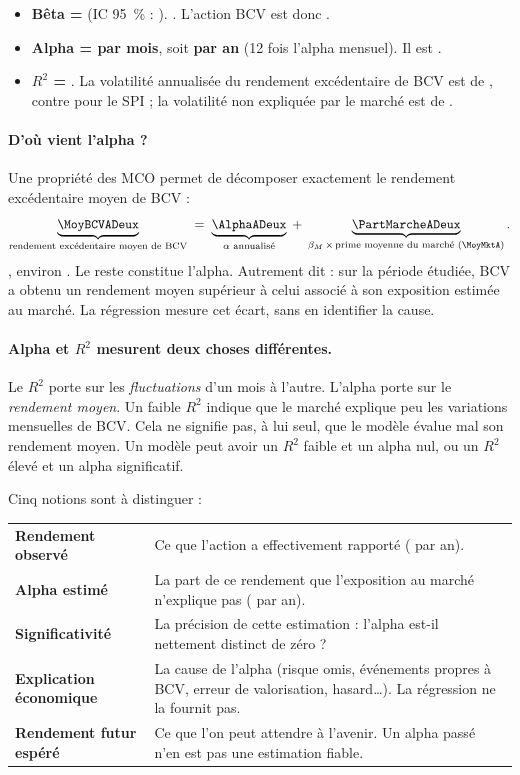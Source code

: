 \documentclass[11pt,a4paper]{article}
\begin{document}
\begin{itemize}[leftmargin=*]
  \item \textbf{Bêta = \BetaM{}} (IC 95~\% : \BetaIC). \BetaPhrase. L'action BCV est donc \BetaSens.
  \item \textbf{Alpha = \AlphaM{} par mois}, soit \textbf{\AlphaA{} par an} (12 fois l'alpha mensuel). Il est \AlphaSens.
  \item \textbf{$R^2$ = \RDeux{}}. \RDeuxPhrase{} La volatilité annualisée du rendement excédentaire de BCV est de \VolBCV{}, contre \VolSPI{} pour le SPI ; la volatilité non expliquée par le marché est de \SigmaA{}.
\end{itemize}

\paragraph{D'où vient l'alpha ?} Une propriété des MCO permet de décomposer exactement le rendement excédentaire moyen de BCV :
\[
  \underbrace{\text{\MoyBCVADeux}}_{\text{rendement excédentaire moyen de BCV}}
  \;=\; \underbrace{\text{\AlphaADeux}}_{\alpha \text{ annualisé}}
  \;+\; \underbrace{\text{\PartMarcheADeux}}_{\beta_M \,\times\, \text{prime moyenne du marché (\MoyMktA)}} .
\]
\BetaPartPhrase{}, environ \PartMarchePct{}. Le reste constitue l'alpha. Autrement dit : sur la période étudiée, BCV a obtenu un rendement moyen supérieur à celui associé à son exposition estimée au marché. La régression mesure cet écart, sans en identifier la cause.

\paragraph{Alpha et $R^2$ mesurent deux choses différentes.} Le $R^2$ porte sur les \emph{fluctuations} d'un mois à l'autre. L'alpha porte sur le \emph{rendement moyen}. Un faible $R^2$ indique que le marché explique peu les variations mensuelles de BCV. Cela ne signifie pas, à lui seul, que le modèle évalue mal son rendement moyen. Un modèle peut avoir un $R^2$ faible et un alpha nul, ou un $R^2$ élevé et un alpha significatif.

Cinq notions sont à distinguer :

\begin{center}\small
\begin{tabularx}{\textwidth}{@{}>{\bfseries}p{}X@{}}
\toprule
Rendement observé & Ce que l'action a effectivement rapporté (\RendAnnBCV{} par an). \\
Alpha estimé & La part de ce rendement que l'exposition au marché n'explique pas (\AlphaA{} par an). \\
Significativité & La précision de cette estimation : l'alpha est-il nettement distinct de zéro ? \\
Explication économique & La cause de l'alpha (risque omis, événements propres à BCV, erreur de valorisation, hasard…). La régression ne la fournit pas. \\
Rendement futur espéré & Ce que l'on peut attendre à l'avenir. Un alpha passé n'en est pas une estimation fiable. \\
\bottomrule
\end{tabularx}
\end{center}
\end{document}
